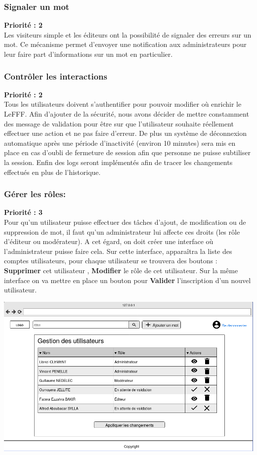 \documentclass[12pt,a4paper]{article}
\begin{document}
\subsubsection{Signaler un mot}
 \textbf{Priorité : 2}
 \\ Les visiteurs simple et les éditeurs ont la possibilité de signaler des erreurs sur un mot. Ce mécanisme permet d'envoyer une notification aux administrateurs pour leur faire part d'informations sur un mot en particulier. 

\subsubsection{Contrôler les interactions }
 \textbf{Priorité : 2}
\\ Tous les utilisateurs doivent s'authentifier pour pouvoir modifier où enrichir le LeFFF. Afin d'ajouter de la sécurité, nous avons décider de mettre constamment des message de validation pour être sur que l'utilisateur souhaite réellement effectuer une action et ne pas faire d'erreur.
De plus un système de déconnexion automatique après une période d'inactivité (environ 10 minutes) sera mis en place en cas d'oubli de fermeture de session afin que personne ne puisse subtiliser la session.
Enfin des logs seront implémentés afin de tracer les changements effectués en plus de l'historique.

\subsubsection{Gérer les rôles:}
 \textbf{Priorité : 3} \\
Pour qu'un utilisateur puisse effectuer des tâches d'ajout, de modification ou de suppression de mot, il faut qu'un administrateur lui affecte ces droits (les rôle d'éditeur ou modérateur). A cet égard, on doit créer une interface où l'administrateur puisse faire cela.
Sur cette interface, apparaîtra la liste des comptes utilisateurs, pour chaque utilisateur se trouvera des boutons  : \textbf{Supprimer} cet utilisateur ,\textbf{ Modifier} le rôle de cet utilisateur. 
Sur la même interface on va mettre en place un bouton pour \textbf{Valider} l'inscription d'un nouvel utilisateur.
\begin{center}\includegraphics[width=150mm]{img/user_screen.png}\end{center}
\end{document}
